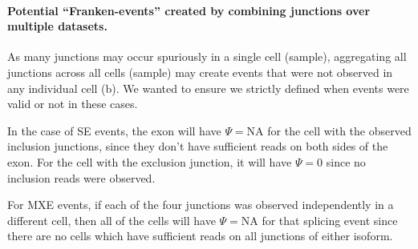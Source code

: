\paragraph{Potential ``Franken-events'' created by combining junctions over multiple datasets.} As many junctions may occur spuriously in a single cell (sample), aggregating all junctions across all cells (sample) may create events that were not observed in any individual cell (b). We wanted to ensure we strictly defined when events were valid or not in these cases.

In the case of SE events, the exon will have $\Psi = \text{NA}$ for the cell with the observed inclusion junctions, since they don't have sufficient reads on both sides of the exon. For the cell with the exclusion junction, it will have $\Psi = 0$ since no inclusion reads were observed.

For MXE events, if each of the four junctions was observed independently in a different cell, then all of the cells will have $\Psi = \text{NA}$ for that splicing event since there are no cells which have sufficient reads on all junctions of either isoform.

